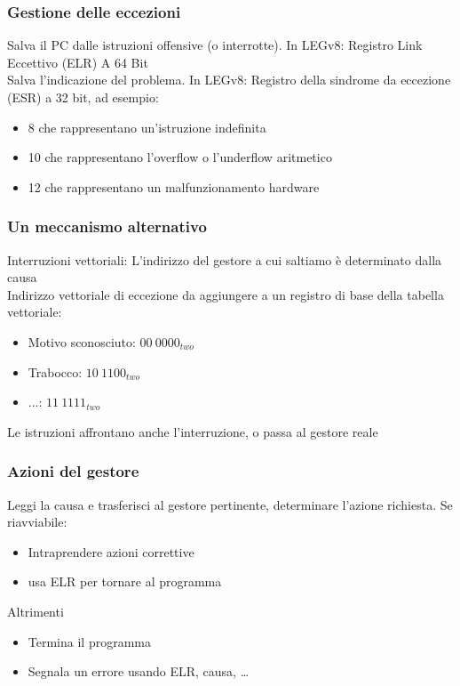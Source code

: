 \documentclass[12pt,a4paper]{article}
\begin{document}
\subsubsection{Gestione delle eccezioni}
Salva il PC dalle istruzioni offensive (o interrotte). In LEGv8: Registro Link Eccettivo (ELR) A 64 Bit\\
Salva l'indicazione del problema. In LEGv8: Registro della sindrome da eccezione (ESR) a 32 bit, ad esempio:
\begin{itemize}
\item 8 che rappresentano un'istruzione indefinita
\item 10 che rappresentano l'overflow o l'underflow aritmetico
\item 12 che rappresentano un malfunzionamento hardware
\end{itemize}
\subsubsection{Un meccanismo alternativo}
Interruzioni vettoriali: L'indirizzo del gestore a cui saltiamo è determinato dalla causa\\
Indirizzo vettoriale di eccezione da aggiungere a un registro di base della tabella vettoriale:
\begin{itemize} 
\item Motivo sconosciuto: $00\ 0000_{two}$
\item Trabocco: $10\ 1100_{two}$
\item  ...: $11\ 1111_{two}$
\end{itemize}
Le istruzioni affrontano anche l'interruzione, o passa al gestore reale
\subsubsection{Azioni del gestore}
Leggi la causa e trasferisci al gestore pertinente, determinare l'azione richiesta. Se riavviabile:
\begin{itemize}
\item Intraprendere azioni correttive
\item usa ELR per tornare al programma
\end{itemize}
Altrimenti
\begin{itemize}
\item Termina il programma
\item Segnala un errore usando ELR, causa, \dots
\end{itemize}
\end{document}
